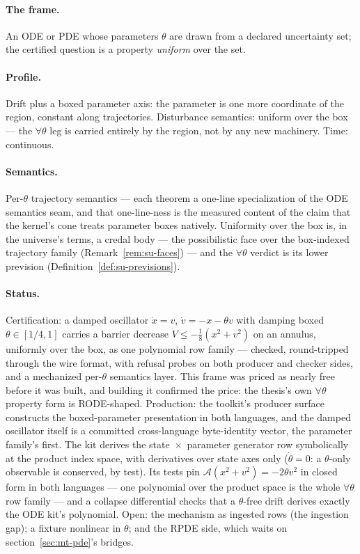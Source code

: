 \paragraph{The frame.} An ODE or PDE whose parameters $\theta$ are
drawn from a declared uncertainty set; the certified question is a
property \emph{uniform} over the set.

\paragraph{Profile.} Drift plus a boxed parameter axis: the
parameter is one more coordinate of the region, constant along
trajectories. Disturbance semantics: uniform over the box --- the
$\forall\theta$ leg is carried entirely by the region, not by any new
machinery. Time: continuous.

\paragraph{Semantics.} Per-$\theta$ trajectory semantics --- each
theorem a one-line specialization of the ODE semantics seam, and that
one-line-ness is the measured content of the claim that the kernel's
cone treats parameter boxes natively. Uniformity over the box is, in
the universe's terms, a credal body --- the possibilistic face
over the box-indexed trajectory family (Remark~\ref{rem:su-faces})
--- and the $\forall\theta$ verdict is its lower prevision
(Definition~\ref{def:su-previsions}).

\paragraph{Status.} Certification: a damped oscillator
$\dot x = v$, $\dot v = -x - \theta v$ with damping boxed
$\theta \in [1/4, 1]$ carries a barrier decrease
$\dot V \le -\tfrac18 (x^2 + v^2)$ on an annulus, uniformly over the
box, as one polynomial row family --- checked, round-tripped through
the wire format, with refusal probes on both producer and checker
sides, and a mechanized per-$\theta$ semantics layer. This frame was
priced as nearly free before it was built, and building it confirmed
the price: the thesis's own $\forall\theta$ property form is
RODE-shaped. Production: the toolkit's producer surface constructs
the boxed-parameter presentation in both languages, and the damped
oscillator itself is a committed cross-language byte-identity
vector, the parameter family's first. The kit derives the
state~$\times$~parameter generator row symbolically at the product
index space, with derivatives over state axes only ($\dot\theta =
0$: a $\theta$-only observable is conserved, by test). Its tests pin
$\mathcal{A}(x^2 + v^2) = -2\theta v^2$ in closed form in both
languages --- one polynomial over the product space is the whole
$\forall\theta$ row family --- and a collapse differential checks
that a $\theta$-free drift derives exactly the ODE kit's polynomial.
Open: the mechanism as ingested rows (the ingestion gap); a fixture
nonlinear in $\theta$; and the RPDE side, which waits on
section~\ref{sec:mt-pde}'s bridges.

